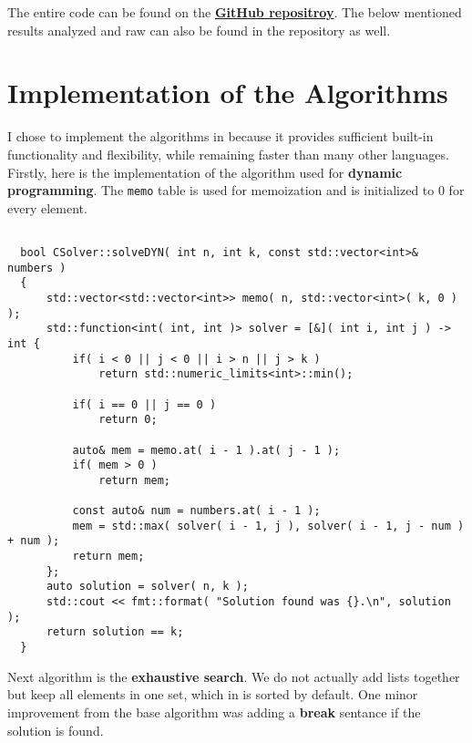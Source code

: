 \documentclass[11pt]{article}
\begin{document}
\maketitle

The entire code can be found on the \href{https://github.com/Edelwy/approximation-algorithms}{\textbf{GitHub repositroy}}. The below mentioned results analyzed and raw can also be found in the repository as well.

\section{Implementation of the Algorithms}

I chose to implement the algorithms in \cpp because it provides sufficient built-in functionality and flexibility, while remaining faster than many other languages. Firstly, here is the implementation of the algorithm used for \textbf{dynamic programming}. The \texttt{memo} table is used for memoization and is initialized to $0$ for every element.

\begin{verbatim}

  bool CSolver::solveDYN( int n, int k, const std::vector<int>& numbers )
  {
      std::vector<std::vector<int>> memo( n, std::vector<int>( k, 0 ) );
      std::function<int( int, int )> solver = [&]( int i, int j ) -> int {
          if( i < 0 || j < 0 || i > n || j > k )
              return std::numeric_limits<int>::min();
  
          if( i == 0 || j == 0 )
              return 0;
  
          auto& mem = memo.at( i - 1 ).at( j - 1 );
          if( mem > 0 ) 
              return mem;
  
          const auto& num = numbers.at( i - 1 );
          mem = std::max( solver( i - 1, j ), solver( i - 1, j - num ) + num );
          return mem;
      };
      auto solution = solver( n, k );
      std::cout << fmt::format( "Solution found was {}.\n", solution );
      return solution == k;
  }
\end{verbatim}

Next algorithm is the \textbf{exhaustive search}. We do not actually add lists together but keep all elements in one set, which in \cpp is sorted by default. One minor improvement from the base algorithm was adding a \textbf{break} sentance if the solution is found.
\end{document}
